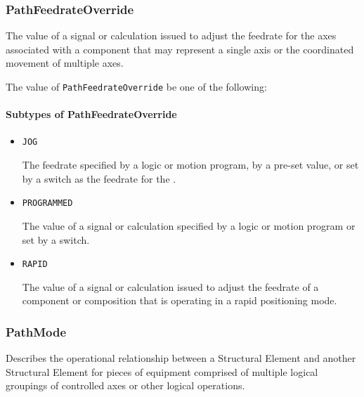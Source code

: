 \subsubsection{PathFeedrateOverride}
\label{sec:PathFeedrateOverride}



The value of a signal or calculation issued to adjust the feedrate for the axes associated with a  component that may represent a single axis or the coordinated movement of multiple axes.


The value of \texttt{PathFeedrateOverride} \MUST be one of the following: 

\FloatBarrier

\paragraph{Subtypes of PathFeedrateOverride}\mbox{}
\label{sec:Subtypes of PathFeedrateOverride}

\begin{itemize}

\item \texttt{JOG}


The feedrate specified by a logic or motion program, by a pre-set value, or set by a switch as the feedrate for the . 

\item \texttt{PROGRAMMED}


The value of a signal or calculation specified by a logic or motion program or set by a switch.

\item \texttt{RAPID}


The value of a signal or calculation issued to adjust the feedrate of a component or composition that is operating in a rapid positioning mode.


\end{itemize}

\subsubsection{PathMode}
\label{sec:PathMode}



Describes the operational relationship between a  \gls{Structural Element} and another  \gls{Structural Element} for pieces of equipment comprised of multiple logical groupings of controlled axes or other logical operations.


